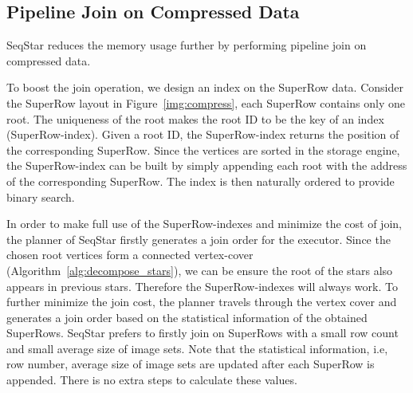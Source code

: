 \subsection{Pipeline Join on Compressed Data}\label{sec:match_join}
SeqStar reduces the memory usage further by performing pipeline join on compressed data.

To boost the join operation, we design an index on the SuperRow data.
Consider the SuperRow layout in Figure~\ref{img:compress}, each SuperRow contains only one root.
The uniqueness of the root makes the root ID to be the key of an index (SuperRow-index).
Given a root ID, the SuperRow-index returns the position of the corresponding SuperRow.
Since the vertices are sorted in the storage engine, the SuperRow-index can be built by simply appending each root with the address of the corresponding SuperRow. The index is then naturally ordered to provide binary search.

In order to make full use of the SuperRow-indexes and minimize the cost of join,
the planner of SeqStar firstly generates a join order for the executor.
Since the chosen root vertices form a connected vertex-cover (Algorithm~\ref{alg:decompose_stars}),
we can be ensure the root of the stars also appears in previous stars.
Therefore the SuperRow-indexes will always work.
To further minimize the join cost, the planner travels through the vertex cover and generates a join order based on the statistical information of the obtained SuperRows.
SeqStar prefers to firstly join on SuperRows with a small row count and small average size of image sets.
Note that the statistical information, i.e, row number, average size of image sets are updated after each SuperRow is appended.
There is no extra steps to calculate these values.

